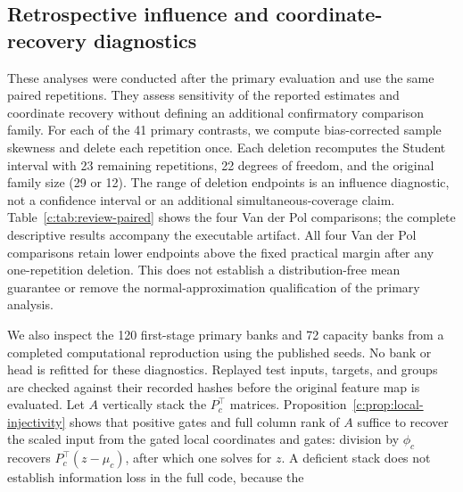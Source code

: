 \subsection{Retrospective influence and coordinate-recovery diagnostics}\label{c:app:review-diagnostics}
These analyses were conducted after the primary evaluation and use the same
paired repetitions. They assess sensitivity of the reported estimates and
coordinate recovery without defining an additional confirmatory comparison family. For each of the 41 primary contrasts, we compute bias-corrected sample
skewness and delete each repetition once. Each deletion recomputes the Student
interval with 23 remaining repetitions, 22 degrees of freedom, and the original
family size (29 or 12). The range of deletion endpoints is an influence diagnostic,
not a confidence interval or an additional simultaneous-coverage claim.
Table~\ref{c:tab:review-paired} shows the four Van der Pol comparisons; the complete
descriptive results accompany the executable artifact.
All four Van der Pol comparisons retain lower endpoints above the fixed practical
margin after any one-repetition deletion. This does not establish a distribution-free
mean guarantee or remove the normal-approximation qualification of the primary analysis.
\begin{table}[htbp]
\caption{Retrospective Van der Pol influence diagnostics. Lower endpoints are multiplied
by $10^3$; the fixed margin on this scale is $0.148907$. Skewness is the bias-corrected
Fisher--Pearson sample coefficient. The minimum deletion lower endpoint is the smallest
over all 24 one-repetition deletions. The final column counts individual paired
differences exceeding the margin; it is not a mean-effect confidence statement.}
\label{c:tab:review-paired}
\centering\small\setlength{\tabcolsep}{4pt}

\end{table}
We also inspect the 120 first-stage primary banks and 72 capacity banks from a
completed computational reproduction using the published seeds. No bank or head is
refitted for these diagnostics. Replayed test inputs, targets, and groups are checked
against their recorded hashes before the original feature map is evaluated.
Let $A$ vertically stack the $P_c^\top$ matrices. Proposition~\ref{c:prop:local-injectivity}
shows that positive gates and full column rank of $A$ suffice to recover the scaled
input from the gated local coordinates and gates:
division by $\phi_c$ recovers $P_c^\top(z-\mu_c)$, after which one solves for $z$.
A deficient stack does not establish information loss in the full code, because the
